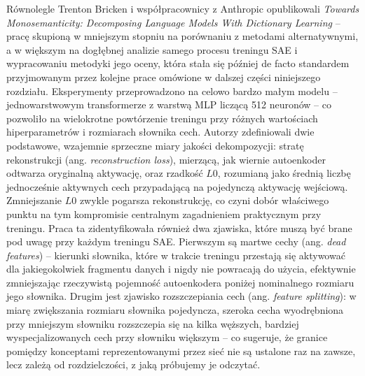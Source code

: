 Równolegle Trenton Bricken i współpracownicy z Anthropic opublikowali \textit{Towards Monosemanticity: Decomposing Language Models With Dictionary Learning} \cite{bricken_2023_towards_monosemanticity_dictionary_learning} -- pracę skupioną w mniejszym stopniu na porównaniu z metodami alternatywnymi, a w większym na dogłębnej analizie samego procesu treningu SAE i wypracowaniu metodyki jego oceny, która stała się później de facto standardem przyjmowanym przez kolejne prace omówione w dalszej części niniejszego rozdziału. Eksperymenty przeprowadzono na celowo bardzo małym modelu -- jednowarstwowym transformerze z warstwą MLP liczącą 512 neuronów -- co pozwoliło na wielokrotne powtórzenie treningu przy różnych wartościach hiperparametrów i rozmiarach słownika cech. Autorzy zdefiniowali dwie podstawowe, wzajemnie sprzeczne miary jakości dekompozycji: stratę rekonstrukcji (ang. \textit{reconstruction loss}), mierzącą, jak wiernie autoenkoder odtwarza oryginalną aktywację, oraz rzadkość $L0$, rozumianą jako średnią liczbę jednocześnie aktywnych cech przypadającą na pojedynczą aktywację wejściową. Zmniejszanie $L0$ zwykle pogarsza rekonstrukcję, co czyni dobór właściwego punktu na tym kompromisie centralnym zagadnieniem praktycznym przy treningu. \newline
Praca ta zidentyfikowała również dwa zjawiska, które muszą być brane pod uwagę przy każdym treningu SAE. Pierwszym są martwe cechy (ang. \textit{dead features}) -- kierunki słownika, które w trakcie treningu przestają się aktywować dla jakiegokolwiek fragmentu danych i nigdy nie powracają do użycia, efektywnie zmniejszając rzeczywistą pojemność autoenkodera poniżej nominalnego rozmiaru jego słownika. Drugim jest zjawisko rozszczepiania cech (ang. \textit{feature splitting}): w miarę zwiększania rozmiaru słownika pojedyncza, szeroka cecha wyodrębniona przy mniejszym słowniku rozszczepia się na kilka węższych, bardziej wyspecjalizowanych cech przy słowniku większym -- co sugeruje, że granice pomiędzy konceptami reprezentowanymi przez sieć nie są ustalone raz na zawsze, lecz zależą od rozdzielczości, z jaką próbujemy je odczytać.

